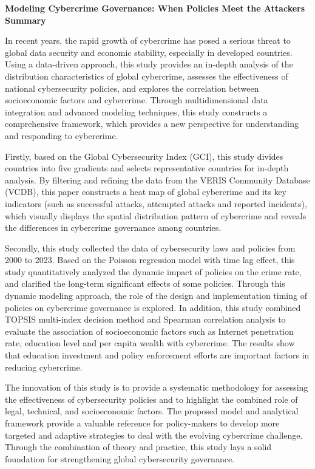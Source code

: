 \documentclass[12pt]{article}
\begin{document}
\begin{center}
	\fontsize{16}{19}\selectfont \textbf{Modeling Cybercrime Governance: When Policies Meet the Attackers} \\
	\bigskip
	\fontsize{16}{19}\selectfont \textbf{Summary} \\
\end{center}
\begin{adjustwidth}{2em}{2em}
	\hspace*{1.5em}
	In recent years, the rapid growth of cybercrime has posed a serious threat to global data security and economic stability,
	especially in developed countries.
	Using a data-driven approach,
	this study provides an in-depth analysis of the distribution characteristics of global cybercrime,
	assesses the effectiveness of national cybersecurity policies, and
	explores the correlation between socioeconomic factors and cybercrime.
	Through multidimensional data integration and advanced modeling techniques,
	this study constructs a comprehensive framework,
	which provides a new perspective for understanding and responding to cybercrime.

	Firstly, based on the Global Cybersecurity Index (GCI),
	this study divides countries into five gradients and selects representative countries for in-depth analysis.
	By filtering and refining the data from the VERIS Community Database (VCDB),
	this paper constructs a heat map of global cybercrime and its key indicators
	(such as successful attacks, attempted attacks and reported incidents),
	which visually displays the spatial distribution pattern of cybercrime and
	reveals the differences in cybercrime governance among countries.

	Secondly, this study collected the data of cybersecurity laws and policies from 2000 to 2023.
	Based on the Poisson regression model with time lag effect,
	this study quantitatively analyzed the dynamic impact of policies on the crime rate, and
	clarified the long-term significant effects of some policies.
	Through this dynamic modeling approach,
	the role of the design and implementation timing of policies on cybercrime governance is explored.
	In addition, this study combined TOPSIS multi-index decision method and Spearman correlation analysis
	to evaluate the association of socioeconomic factors
	such as Internet penetration rate, education level and per capita wealth with cybercrime.
	The results show that education investment and policy enforcement efforts are important factors in reducing cybercrime.

	The innovation of this study is
	to provide a systematic methodology for assessing the effectiveness of cybersecurity policies and
	to highlight the combined role of legal, technical, and socioeconomic factors.
	The proposed model and analytical framework provide a valuable reference for policy-makers
	to develop more targeted and adaptive strategies to deal with the evolving cybercrime challenge.
	Through the combination of theory and practice,
	this study lays a solid foundation for strengthening global cybersecurity governance.
\end{adjustwidth}
\end{document}
